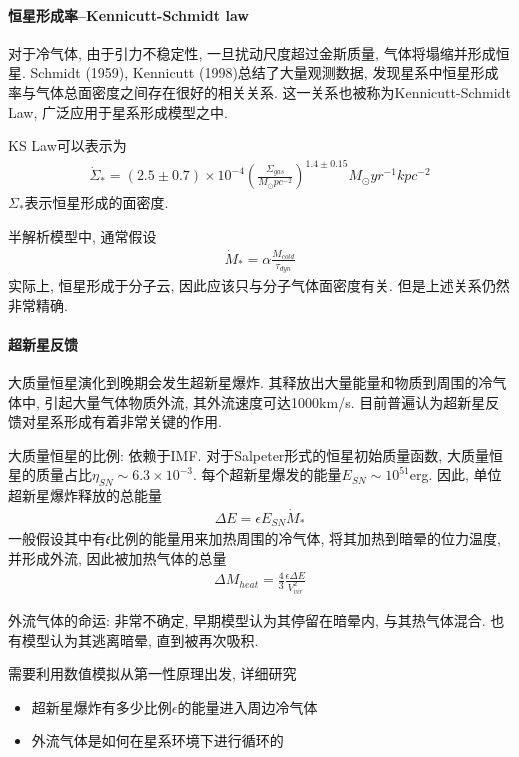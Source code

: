 \paragraph{恒星形成率--Kennicutt-Schmidt law}
对于冷气体, 由于引力不稳定性, 一旦扰动尺度超过金斯质量, 气体将塌缩并形成恒星. Schmidt (1959),  Kennicutt (1998)总结了大量观测数据, 发现星系中恒星形成率与气体总面密度之间存在很好的相关关系. 这一关系也被称为Kennicutt-Schmidt Law, 广泛应用于星系形成模型之中. 

KS Law可以表示为
\begin{align*}
    \dot{\Sigma}_*=(2.5\pm 0.7)\times10^{-4}\left( \frac{\Sigma_{gas}}{M_{\odot}pc^{-2}} \right)^{1.4\pm 0.15}M_{\odot}yr^{-1}kpc^{-2}
\end{align*}
$\Sigma_*$表示恒星形成的面密度. 

半解析模型中, 通常假设
\begin{align*}
    \dot{M}_*=\alpha\frac{M_{cold}}{\tau_{dyn}}
\end{align*}
实际上, 恒星形成于分子云, 因此应该只与分子气体面密度有关. 但是上述关系仍然非常精确. 

\paragraph{超新星反馈}
大质量恒星演化到晚期会发生超新星爆炸. 其释放出大量能量和物质到周围的冷气体中, 引起大量气体物质外流, 其外流速度可达1000km/s. 目前普遍认为超新星反馈对星系形成有着非常关键的作用. 

大质量恒星的比例: 依赖于IMF. 对于Salpeter形式的恒星初始质量函数, 大质量恒星的质量占比$\eta_{SN} \sim 6.3\times10^{-3}$. 每个超新星爆发的能量$E_{SN}\sim 10^{51}$erg. 因此, 单位超新星爆炸释放的总能量
\begin{align*}
    \Delta E=\epsilon E_{SN}\dot{M}_*
\end{align*}
一般假设其中有𝜖比例的能量用来加热周围的冷气体, 将其加热到暗晕的位力温度, 并形成外流, 因此被加热气体的总量
\begin{align*}
    \Delta M_{heat}=\frac{4}{3}\frac{\epsilon \Delta E}{V_{vir}^2}
\end{align*}

外流气体的命运: 非常不确定, 早期模型认为其停留在暗晕内, 与其热气体混合. 也有模型认为其逃离暗晕, 直到被再次吸积. 

需要利用数值模拟从第一性原理出发, 详细研究
\begin{itemize}
    \item  超新星爆炸有多少比例$\epsilon$的能量进入周边冷气体
    \item 外流气体是如何在星系环境下进行循环的
\end{itemize}


